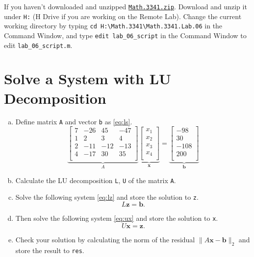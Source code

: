 If you haven't downloaded and unzipped \href{https://libaoj.in/courses/2021f/MATH3341/zip/Math.3341.zip}{\texttt{Math.3341.zip}}. Download and unzip it under \verb|H:| (H Drive if you are working on the Remote Lab). Change the current working directory by typing \verb|cd H:\Math.3341\Math.3341.Lab.06| in the Command Window, and type \verb|edit lab_06_script| in the Command Window to edit \verb|lab_06_script.m|.

\section{Solve a System with LU Decomposition}
\label{sec:lu}
\begin{enumerate}[(a)]
\item Define matrix \verb|A| and vector \verb|b| as \eqref{eq:ls}.
  \begin{equation}
  \label{eq:ls}
  \underbrace{
  \begin{bmatrix}
    7 & -26 &  45 & -47 \\
    1 &   2 &   3 &   4 \\
    2 & -11 & -12 & -13 \\
    4 & -17 &  30 &  35 \\
  \end{bmatrix}}_{A}
  \underbrace{
  \begin{bmatrix}
    x_1 \\
    x_2 \\
    x_3 \\
    x_4 \\
  \end{bmatrix}}_{\mathbf{x}}
  =
  \underbrace{
  \begin{bmatrix}
     -98 \\
      30 \\
    -108 \\
     200 \\
  \end{bmatrix}}_{\mathbf{b}}
  \end{equation}
\item Calculate the LU decomposition \verb|L|, \verb|U| of the matrix \verb|A|.
\item \label{enu:lz} Solve the following system \eqref{eq:lz} and store the solution to \verb|z|.
  \begin{equation}
  \label{eq:lz}
  L \mathbf{z} = \mathbf{b}.
  \end{equation}
\item \label{enu:ux} Then solve the following system \eqref{eq:ux} and store the solution to \verb|x|.
    \begin{equation}
    \label{eq:ux}
    U \mathbf{x} = \mathbf{z}.
    \end{equation}
\item Check your solution by calculating the norm of the residual $\|A\mathbf{x} - \mathbf{b}\|_2$ and store the result to \verb|res|.
\end{enumerate}
